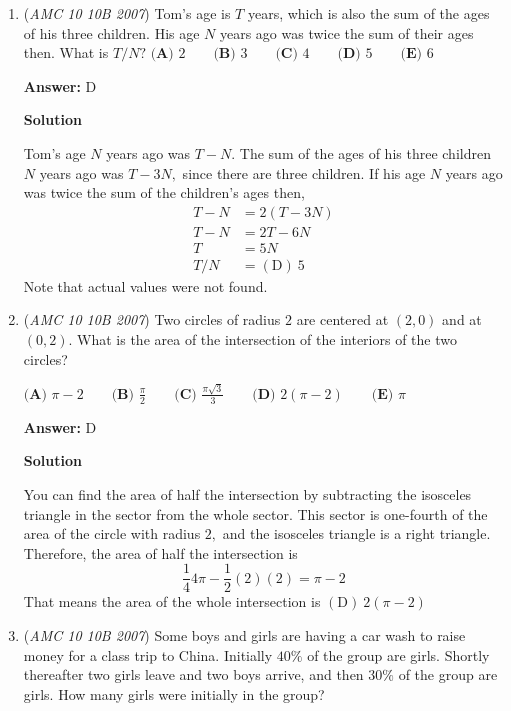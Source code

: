 \begin{enumerate}
 


	\item (\textit{AMC 10 10B 2007}) Tom's age is $T$ years, which is also the sum of the ages of his three children. His age $N$ years ago was twice the sum of their ages then. What is $T/N?$
$\textbf{(A) } 2 \qquad\textbf{(B) } 3 \qquad\textbf{(C) } 4 \qquad\textbf{(D) } 5 \qquad\textbf{(E) } 6$

 \textbf{Answer: }D



\textbf{Solution}

Tom's age $N$ years ago was $T-N$. The sum of the ages of his three children $N$ years ago was $T-3N,$ since there are three children. If his age $N$ years ago was twice the sum of the children's ages then,
 \begin{align*}T-N&=2(T-3N)\\ T-N&=2T-6N\\ T&=5N\\ T/N&=\boxed{\mathrm{(D) \ } 5}\end{align*}
Note that actual values were not found.

 


	\item (\textit{AMC 10 10B 2007}) Two circles of radius $2$ are centered at $(2,0)$ and at $(0,2).$ What is the area of the intersection of the interiors of the two circles?


 $\textbf{(A) } \pi -2 \qquad\textbf{(B) } \frac{\pi}{2} \qquad\textbf{(C) } \frac{\pi \sqrt{3}}{3} \qquad\textbf{(D) } 2(\pi -2) \qquad\textbf{(E) } \pi$

 \textbf{Answer: }D



\textbf{Solution}

You can find the area of half the intersection by subtracting the isosceles triangle in the sector from the whole sector. This sector is one-fourth of the area of the circle with radius $2,$ and the isosceles triangle is a right triangle. Therefore, the area of half the intersection is
 \[\frac{1}{4} 4\pi - \frac{1}{2}(2)(2) = \pi - 2\]That means the area of the whole intersection is $\boxed{\mathrm{(D) \ } 2(\pi-2)}$



	\item (\textit{AMC 10 10B 2007}) Some boys and girls are having a car wash to raise money for a class trip to China. Initially $40\%$ of the group are girls. Shortly thereafter two girls leave and two boys arrive, and then $30\%$ of the group are girls. How many girls were initially in the group?



\end{enumerate}
